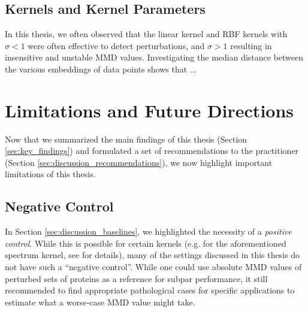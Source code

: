 \subsection{Kernels and Kernel Parameters}
In this thesis, we often observed that the linear kernel and RBF kernels with
$\sigma<1$ were often effective to detect perturbations, and $\sigma>1$
resulting in insensitive and unstable MMD values. Investigating the median
distance between the various embeddings of data points shows that ...

\section{Limitations and Future Directions}\label{sec:discussion_limitations}

Now that we summarized the main findings of this thesis (Section
\ref{sec:key_findings}) and formulated a set of recommendations to the
practitioner (Section \ref{sec:discussion_recommendations}), we now highlight
important limitations of this thesis.


\subsection{Negative Control}

In Section \ref{sec:discussion_baselines}, we highlighted the necessity of a
\emph{positive control}. While this is possible for certain kernels (e.g. for
the aforementioned spectrum kernel, see \cite{kucera2021conditional} for
details), many of the settings discussed in this thesis do not have such a
``negative control''. While one could use absolute MMD values of perturbed sets
of proteins as a reference for subpar performance, it still recommended to find
appropriate pathological cases for specific applications to estimate what a worse-case
MMD value might take.



